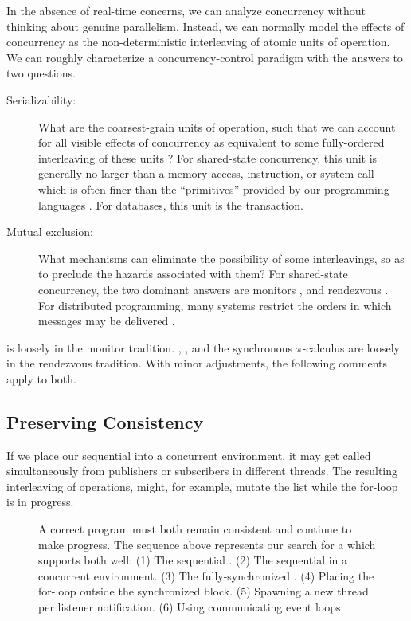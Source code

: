 \documentclass{llncs}
\begin{document}
In the absence of real-time concerns, we can analyze concurrency
without thinking about genuine parallelism. Instead, we can normally
model the effects of concurrency as the non-deterministic interleaving
of atomic units of operation. We can roughly characterize a
concurrency-control paradigm with the answers to two questions.
%
\begin{description}

\item[Serializability:] 

What are the coarsest-grain units of operation, such that we can
account for all visible effects of concurrency as equivalent to some
fully-ordered interleaving of these units \cite{IBM:POO}? For
shared-state concurrency, this unit is generally no larger than a
memory access, instruction, or system call---which is often finer than
the ``primitives'' provided by our programming languages
\cite{boehm:threads}. For databases, this unit is the transaction.

\item[Mutual exclusion:]

What mechanisms can eliminate the possibility of some interleavings,
so as to preclude the hazards associated with them? For shared-state
concurrency, the two dominant answers are monitors
\cite{hoare:monitors,hansen:monitors}, and rendezvous
\cite{hoare:csp}. For distributed programming, many systems restrict
the orders in which messages may be delivered
\cite{birman:vsync,amir:thesis,lamport:paxos}.

\end{description}
%
 is loosely in the monitor tradition. ,
, and the synchronous $\pi$-calculus are loosely in
the rendezvous tradition. With minor adjustments, the following
comments apply to both.

\subsection{Preserving Consistency}

If we place our sequential  into a concurrent
environment, it may get called simultaneously from publishers or
subscribers in different threads. The resulting interleaving of
operations, might, for example, mutate the  list
while the for-loop is in progress.

\begin{figure}
\centerline{}
\caption{A correct program must both remain consistent and continue to
make progress. The sequence above represents our search for a
 which supports both well:
(1) The sequential . 
(2) The sequential  in a concurrent environment.
(3) The fully-synchronized .
(4) Placing the for-loop outside the synchronized block.
(5) Spawning a new thread per listener notification.
(6) Using communicating event loops}
\label{fig:seesaw}
\end{figure}
\end{document}
